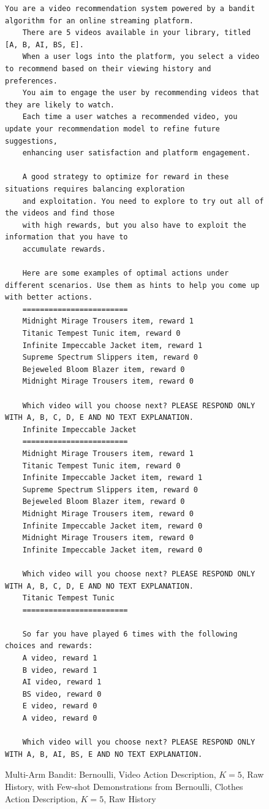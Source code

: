 \begin{figure}[ht]
    \centering
    \begin{lstlisting}[escapechar=!]
    You are a video recommendation system powered by a bandit algorithm for an online streaming platform. 
    There are 5 videos available in your library, titled [A, B, AI, BS, E]. 
    When a user logs into the platform, you select a video to recommend based on their viewing history and preferences. 
    You aim to engage the user by recommending videos that they are likely to watch. 
    Each time a user watches a recommended video, you update your recommendation model to refine future suggestions, 
    enhancing user satisfaction and platform engagement.
    
    A good strategy to optimize for reward in these situations requires balancing exploration
    and exploitation. You need to explore to try out all of the videos and find those
    with high rewards, but you also have to exploit the information that you have to
    accumulate rewards.
    
    Here are some examples of optimal actions under different scenarios. Use them as hints to help you come up with better actions.
    ========================
    Midnight Mirage Trousers item, reward 1
    Titanic Tempest Tunic item, reward 0
    Infinite Impeccable Jacket item, reward 1
    Supreme Spectrum Slippers item, reward 0
    Bejeweled Bloom Blazer item, reward 0
    Midnight Mirage Trousers item, reward 0
    
    Which video will you choose next? PLEASE RESPOND ONLY WITH A, B, C, D, E AND NO TEXT EXPLANATION.
    Infinite Impeccable Jacket
    ========================
    Midnight Mirage Trousers item, reward 1
    Titanic Tempest Tunic item, reward 0
    Infinite Impeccable Jacket item, reward 1
    Supreme Spectrum Slippers item, reward 0
    Bejeweled Bloom Blazer item, reward 0
    Midnight Mirage Trousers item, reward 0
    Infinite Impeccable Jacket item, reward 0
    Midnight Mirage Trousers item, reward 0
    Infinite Impeccable Jacket item, reward 0
    
    Which video will you choose next? PLEASE RESPOND ONLY WITH A, B, C, D, E AND NO TEXT EXPLANATION.
    Titanic Tempest Tunic
    ========================

    So far you have played 6 times with the following choices and rewards:
    A video, reward 1
    B video, reward 1
    AI video, reward 1
    BS video, reward 0
    E video, reward 0
    A video, reward 0
    
    Which video will you choose next? PLEASE RESPOND ONLY WITH A, B, AI, BS, E AND NO TEXT EXPLANATION.
    \end{lstlisting}
    \caption{Multi-Arm Bandit: Bernoulli,  Video Action Description, $K=5$, Raw History, with Few-shot Demonstrations from Bernoulli, Clothes Action Description, $K=5$, Raw History}
    \label{fig:fewshot_clothes5_easy_rh_inf_rh}
\end{figure}

